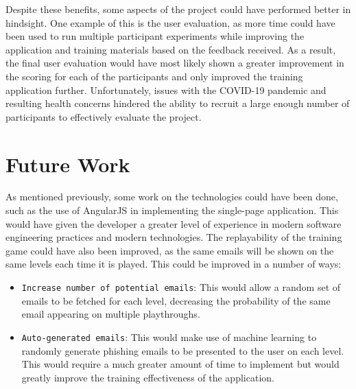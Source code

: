 \documentclass{l4proj}
\begin{document}
Despite these benefits, some aspects of the project could have performed better in hindsight. One example of this is the user evaluation, as more time could have been used to run multiple participant experiments while improving the application and training materials based on the feedback received. As a result, the final user evaluation would have most likely shown a greater improvement in the scoring for each of the participants and only improved the training application further. Unfortunately, issues with the COVID-19 pandemic and resulting health concerns hindered the ability to recruit a large enough number of participants to effectively evaluate the project. 

\section{Future Work}
As mentioned previously, some work on the technologies could have been done, such as the use of AngularJS in implementing the single-page application. This would have given the developer a greater level of experience in modern software engineering practices and modern technologies. The replayability of the training game could have also been improved, as the same emails will be shown on the same levels each time it is played. This could be improved in a number of ways:

\begin{itemize}
    \item \verb|Increase number of potential emails|: This would allow a random set of emails to be fetched for each level, decreasing the probability of the same email appearing on multiple playthroughs.
    \item \verb|Auto-generated emails|: This would make use of machine learning to randomly generate phishing emails to be presented to the user on each level. This would require a much greater amount of time to implement but would greatly improve the training effectiveness of the application.
\end{itemize}

%
% 
\end{document}
